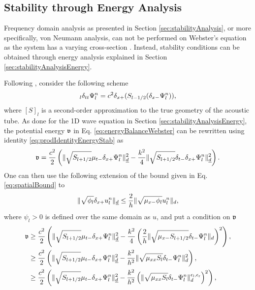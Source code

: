 {\subsection{Stability through Energy Analysis}\label{sec:stabilityEnergyWebster}
Frequency domain analysis as presented in Section \ref{sec:stabilityAnalysis}, or more specifically, von Neumann analysis, can not be performed on Webster's equation as the system has a varying cross-section \cite{theBible}. Instead, stability conditions can be obtained through energy analysis explained in Section \ref{sec:stabilityAnalysisEnergy}.

Following \cite{theBible}, consider the following scheme
\begin{equation}
    [S]_l \delta_{tt}\Psi^n_l = c^2\dxp(\Sm(\delta_{x-}\Psiln)),
\end{equation}
where $[S]_l$ is a second-order approximation to the true geometry of the acoustic tube. As done for the 1D wave equation in Section \ref{sec:stabilityAnalysisEnergy}, the potential energy $\mathfrak{v}$ in Eq. \eqref{eq:energyBalanceWebster} can be rewritten using identity \eqref{eq:prodIdentityEnergyStab} as
\begin{equation*}
    \mathfrak{v} = \frac{c^2}{2}\left(\lVert\sqrt{S_{l+1/2}}\mu_{t-}\delta_{x+}\Psi_l^n\rVert_{\underline{d}}^2-\frac{k^2}{4}\lVert\sqrt{S_{l+1/2}}\delta_{t-}\delta_{x+} \Psi_l^n\rVert_{\underline{d}}^2\right).
\end{equation*}
One can then use the following extension of the bound given in Eq. \eqref{eq:spatialBound} to \cite{theBible}
\begin{equation}\label{eq:spatialBoundWebster}
    \lVert \sqrt{\phi_l}\delta_{x+} u_l^n \rVert_{\underline{d}} \leq\frac{2}{h}\lVert \sqrt{\mu_{x-}\phi_l} u_l^n \rVert_d,
\end{equation}
where $\psi_l > 0$ is defined over the same domain as $u$, and put a condition on $\mathfrak{v}$
\begin{align*}
    \mathfrak{v} &\geq \frac{c^2}{2}\left(\lVert\sqrt{S_{l+1/2}}\mu_{t-}\delta_{x+}\Psi_l^n\rVert_{\underline{d}}^2 - \frac{k^2}{4}\left(\frac{2}{h}\lVert\sqrt{\mu_{x-} S_{l+1/2}}\delta_{t-}\Psi_l^n\rVert_{d}\right)^2\right),\\
    &\geq \frac{c^2}{2}\left(\lVert\sqrt{S_{l+1/2}}\mu_{t-}\delta_{x+}\Psi_l^n\rVert_{\underline{d}}^2 - \frac{k^2}{h^2}\lVert\sqrt{\mu_{xx} S_l}\delta_{t-}\Psi_l^n\rVert_{d}^2\right),\\
    & \geq \frac{c^2}{2}\left(\lVert\sqrt{S_{l+1/2}}\mu_{t-}\delta_{x+}\Psi_l^n\rVert_{\underline{d}}^2 - \frac{k^2}{h^2}\left(\lVert\sqrt{\mu_{xx} S_l}\delta_{t-}\Psi_l^n\rVert_{d}^{\epsilon_\text{l},\epsilon_\text{r}}\right)^2\right),
\end{align*}
}
